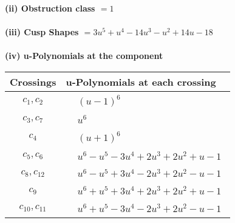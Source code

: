 \documentclass[1p]{elsarticle_modified}
\theoremstyle{definition}
\begin{document}
\flushleft \textbf{(ii) Obstruction class $= 1$}\\~\\
\flushleft \textbf{(iii) Cusp Shapes $= 3 u^5+u^4-14 u^3- u^2+14 u-18$}\\~\\
\newpage\renewcommand{\arraystretch}{1}
\flushleft \textbf{(iv) u-Polynomials at the component}\newline \\
\begin{tabular}{m{50pt}|m{274pt}}
Crossings & \hspace{64pt}u-Polynomials at each crossing \\
\hline $$\begin{aligned}c_{1},c_{2}\end{aligned}$$&$\begin{aligned}
&(u-1)^6
\end{aligned}$\\
\hline $$\begin{aligned}c_{3},c_{7}\end{aligned}$$&$\begin{aligned}
&u^6
\end{aligned}$\\
\hline $$\begin{aligned}c_{4}\end{aligned}$$&$\begin{aligned}
&(u+1)^6
\end{aligned}$\\
\hline $$\begin{aligned}c_{5},c_{6}\end{aligned}$$&$\begin{aligned}
&u^6- u^5-3 u^4+2 u^3+2 u^2+u-1
\end{aligned}$\\
\hline $$\begin{aligned}c_{8},c_{12}\end{aligned}$$&$\begin{aligned}
&u^6- u^5+3 u^4-2 u^3+2 u^2- u-1
\end{aligned}$\\
\hline $$\begin{aligned}c_{9}\end{aligned}$$&$\begin{aligned}
&u^6+u^5+3 u^4+2 u^3+2 u^2+u-1
\end{aligned}$\\
\hline $$\begin{aligned}c_{10},c_{11}\end{aligned}$$&$\begin{aligned}
&u^6+u^5-3 u^4-2 u^3+2 u^2- u-1
\end{aligned}$\\
\hline
\end{tabular}\\~\\
\end{document}
